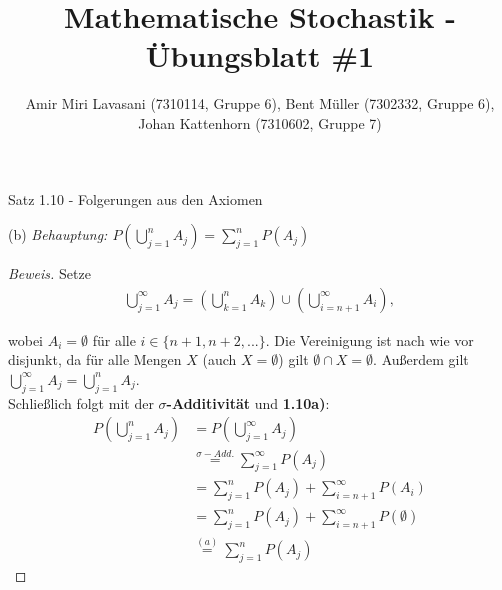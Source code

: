 \documentclass[10pt]{article}
\newenvironment{Aufgabe}[2][Aufgabe]{\begin{trivlist}
\item[\hskip \labelsep {\bfseries #1}\hskip \labelsep {\bfseries #2.}]}{\end{trivlist}}
\begin{document}
 
\title{ \textbf{Mathematische Stochastik - Übungsblatt \#1} }

\author{Amir Miri Lavasani (7310114, Gruppe 6), Bent Müller (7302332, Gruppe 6), \\ 
Johan Kattenhorn (7310602, Gruppe 7)} \maketitle

 
\begin{Aufgabe}{1}
    Satz 1.10 - Folgerungen aus den Axiomen
\end{Aufgabe}

(b) \textit{ Behauptung: $ P\left( \bigcup\limits_{j=1}^{n} A_j \right) = \sum\limits_{j=1}^{n} P(A_j) $ }
\begin{proof}[Beweis]
Setze  
\begin{align*}
    \bigcup\limits_{j=1}^{\infty} A_j = \left( \bigcup\limits_{k=1}^{n} A_k \right) \cup \left( \bigcup\limits_{i=n+1}^{\infty} A_i \right),
\end{align*}

wobei $A_i = \emptyset $ für alle $i\in\{n+1,n+2,...\}$. Die Vereinigung ist nach wie vor disjunkt, da für alle Mengen $X$ (auch $X=\emptyset$) gilt 
$\emptyset \cap X = \emptyset$. Außerdem gilt $ \bigcup\limits_{j=1}^{\infty} A_j = \bigcup\limits_{j=1}^{n} A_j $. \\
Schließlich folgt mit der \textbf{$\sigma$-Additivität} und \textbf{1.10a)}:
\begin{align*}
    P\left( \bigcup\limits_{j=1}^{n} A_j \right) &= P\left( \bigcup\limits_{j=1}^{\infty} A_j \right) \\
                                                 &\stackrel{\sigma-Add.}{=} \sum\limits_{j=1}^{\infty} P(A_j) \\
                                                 &= \sum\limits_{j=1}^{n} P(A_j) + \sum\limits_{i=n+1}^{\infty} P(A_i) \\
                                                 &= \sum\limits_{j=1}^{n} P(A_j) + \sum\limits_{i=n+1}^{\infty} P(\emptyset) \\ 
                                                 &\stackrel{(a)}{=} \sum\limits_{j=1}^{n} P(A_j) 
\end{align*}

\end{proof}
\end{document}
